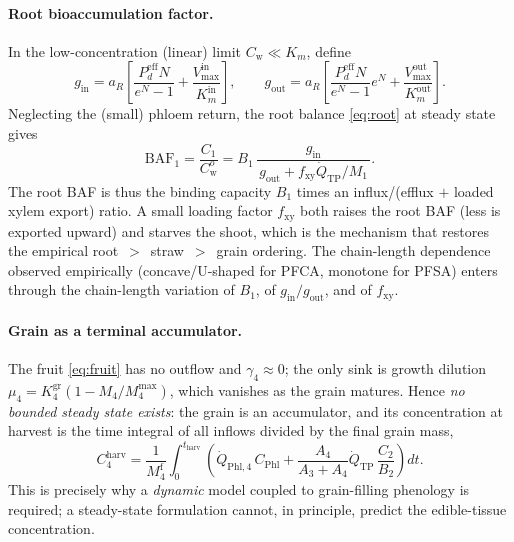 \documentclass[12pt,a4paper]{article}
\newcommand{\Cw}{C_{\mathrm{w}}}
\begin{document}
\paragraph{Root bioaccumulation factor.}  In the low-concentration (linear) limit $\Cw\ll K_m$, define
\begin{equation}\label{eq:gio}
    g_\mathrm{in}=a_R\!\left[\frac{P_d^{\mathrm{eff}}N}{e^{N}-1}+\frac{V_{\max}^{\mathrm{in}}}{K_m^{\mathrm{in}}}\right],\qquad
    g_\mathrm{out}=a_R\!\left[\frac{P_d^{\mathrm{eff}}N}{e^{N}-1}e^{N}+\frac{V_{\max}^{\mathrm{out}}}{K_m^{\mathrm{out}}}\right].
\end{equation}
Neglecting the (small) phloem return, the root balance \eqref{eq:root} at steady state gives
\begin{equation}\label{eq:BAF}
    \mathrm{BAF}_1=\frac{C_1}{\Cw^{o}}=B_1\,\frac{g_\mathrm{in}}{\,g_\mathrm{out}+f_\mathrm{xy}\dot Q_\mathrm{TP}/M_1\,}.
\end{equation}
The root BAF is thus the binding capacity $B_1$ times an influx/(efflux $+$ loaded xylem export) ratio.  A small loading factor $f_\mathrm{xy}$ both raises the root BAF (less is exported upward) and starves the shoot, which is the mechanism that restores the empirical root~$>$~straw~$>$~grain ordering.  The chain-length dependence observed empirically (concave/U-shaped for PFCA, monotone for PFSA) enters through the chain-length variation of $B_1$, of $g_\mathrm{in}/g_\mathrm{out}$, and of $f_\mathrm{xy}$.

\paragraph{Grain as a terminal accumulator.}  The fruit \eqref{eq:fruit} has no outflow and $\gamma_4\approx0$; the only sink is growth dilution $\mu_4=K_4^\mathrm{gr}(1-M_4/M_4^\mathrm{max})$, which vanishes as the grain matures.  Hence \emph{no bounded steady state exists}: the grain is an accumulator, and its concentration at harvest is the time integral of all inflows divided by the final grain mass,
\begin{equation}\label{eq:grain}
    C_4^{\mathrm{harv}}=\frac{1}{M_4^{\mathrm f}}\int_0^{t_\mathrm{harv}}\!\left(\dot Q_\mathrm{Phl,4}\,C_\mathrm{Phl}+\frac{A_4}{A_3+A_4}\dot Q_\mathrm{TP}\,\frac{C_2}{B_2}\right)dt.
\end{equation}
This is precisely why a \emph{dynamic} model coupled to grain-filling phenology is required; a steady-state formulation cannot, in principle, predict the edible-tissue concentration.
\end{document}
